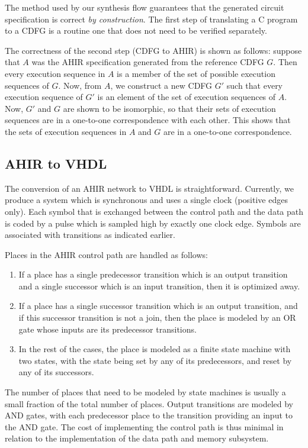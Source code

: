 \documentclass[conference]{IEEEtran}
\begin{document}
The method used by our synthesis flow guarantees that the generated
circuit specification is correct {\em by construction}. The first step
of translating a C program to a CDFG is a routine one that does not
need to be verified separately. 

The correctness of the second step (CDFG to AHIR) is shown
as follows\cite{ahir_thesis}: suppose that
$A$ was the AHIR specification generated from the
reference CDFG $G$.  Then every execution sequence
in $A$ is a member of the set of
possible execution sequences of $G$.  Now,
from $A$, we construct a new CDFG $G'$ such
that every execution sequence of  $G'$  is
an element of the set of execution sequences
of $A$.  Now, $G'$ and $G$ are shown to be isomorphic,
so that their sets of execution sequences are in 
a one-to-one correspondence with each other.  This
shows that the sets of execution sequences in $A$ and
$G$ are in a one-to-one correspondence.

\subsection{AHIR to VHDL}

The conversion of an AHIR network to VHDL is straightforward.
Currently, we produce a system which is synchronous and uses
a single clock (positive edges only).  Each symbol that is
exchanged between the control path and the data path is coded 
by a pulse which is sampled high by exactly one clock
edge.  Symbols are associated with transitions as indicated
earlier.

Places in the AHIR control path are handled as follows:
\begin{enumerate}
\item If a place has a single predecessor transition which is
an output transition and a single successor which is an input
transition, then it is optimized away.
\item If a place has a single successor transition which is
an output transition, and if this successor transition is
not a join, then the place is modeled by an OR gate whose inputs
are its predecessor transitions.
\item In the rest of the cases, the place is modeled as 
a finite state machine with two states, with the state being
set by any of its predecessors, and reset by any of its successors.
\end{enumerate}
The number of places that need to be modeled by state machines is
usually a small fraction of the total number of places.
Output transitions are modeled by AND gates, with each predecessor place
to the transition providing an input to the AND gate.  The cost
of implementing the control path is thus minimal in relation to
the implementation of the data path and memory subsystem.
\end{document}
